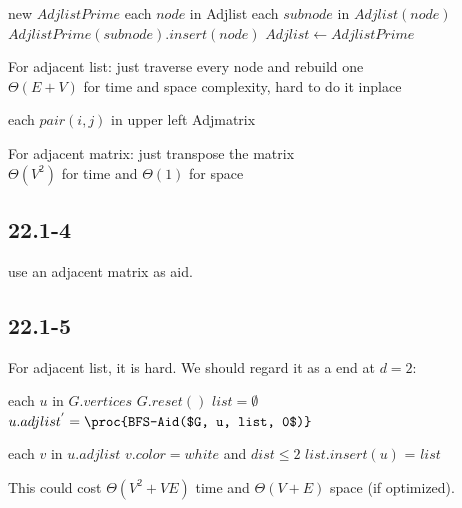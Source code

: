 \documentclass[]{article}
\begin{document}
\begin{codebox}
	\li new $AdjlistPrime$
	\li \For each $node$ in Adjlist
	\li		\Do \For each $subnode$ in $Adjlist(node)$
	\li 		\Do $AdjlistPrime(subnode).insert(node)$
	\li $Adjlist \gets AdjlistPrime$
	\End
\end{codebox}

For adjacent list: just traverse every node and rebuild one\\
$\Theta (E+V)$ for time and space complexity, hard to do it inplace\\

\begin{codebox}
	\li \For each $pair(i,j)$ in upper left Adjmatrix
	\li		\Do {}
	\End
\end{codebox}

For adjacent matrix: just transpose the matrix\\
$\Theta (V^2)$ for time and $\Theta(1)$ for space

\subsection{22.1-4}
use an adjacent matrix as aid.

\subsection{22.1-5}

For adjacent list, it is hard. We should regard it as a  end at $d = 2$:

\begin{codebox}
	
	\li \For each $u$ in $G.vertices$
	\li 	\Do $G.reset()$
	\li     $list = \emptyset$
	\li 	$u.adjlist^{'} = \proc{BFS-Aid($G, u, list, 0$)}$
	\End
	\End
\end{codebox}

\begin{codebox}
	
	\li \For each $v$ in $u.adjlist$
	\li 	\Do \If $v.color = white$ and $dist \le 2$ 
	\li			\Then $list.insert(u)$
	\li 		{}
	\End=
	\End
	\li \Return $list$
\end{codebox}

This could cost $\Theta(V^2 + VE)$ time and $\Theta(V+E)$ space (if optimized).\\
\end{document}
